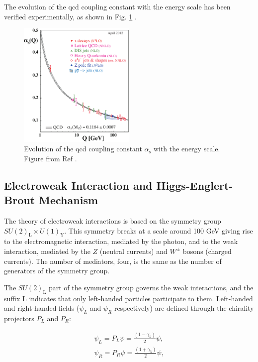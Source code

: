 The evolution of the \gls{qcd} coupling constant with the energy scale has been verified experimentally, as shown in Fig. \ref{fig:sm:alphas} \cite{Bethke:2012jm}.

\begin{figure}[ht]
\centering
\includegraphics[width=0.5\textwidth]{figures/theory/asq-2011}
\caption{Evolution of the \gls{qcd} coupling constant $\alpha_\mathrm{s}$ with the energy scale. Figure from Ref \cite{Bethke:2012jm}.}
\label{fig:sm:alphas}
\end{figure}

\subsection{Electroweak Interaction and Higgs-Englert-Brout Mechanism}
\label{sec:smsusy:ew}

The theory of electroweak interactions is based on the symmetry group $SU(2)_\mathrm{L} \times U(1)_\mathrm{Y}$. This symmetry breaks at a scale around 100 GeV giving rise to the electromagnetic interaction, mediated by the photon, and to the weak interaction, mediated by the $Z$ (neutral currents) and $W^{\pm}$ bosons (charged currents). The number of mediators, four, is the same as the number of generators of the symmetry group. 

The $SU(2)_\mathrm{L}$ part of the symmetry group governs the weak interactions, and the suffix L indicates that only left-handed particles participate to them. Left-handed and right-handed fields ($\psi_L$ and $\psi_R$ respectively) are defined through the chirality projectors $P_L$ and $P_R$:

\begin{equation}
\begin{aligned}
\psi_L = P_L \psi = \frac{(1 - \gamma_5)}{2} \psi, \\
\psi_R = P_R \psi = \frac{(1 + \gamma_5)}{2} \psi,
\end{aligned}
\label{eq:sm:LR}
\end{equation}

